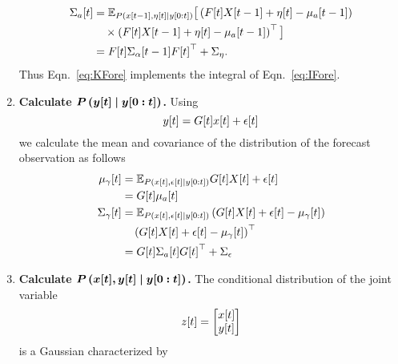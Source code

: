 \begin{enumerate}
\begin{align}
     {\Sigma_a}{[t]} &= \mathbb{E}_{P
       \left({x}{[t-1]},{\eta}{[t]}\mid y[0:t] \right)} \big[
     \left( {F}{[t]}{X}{[t-1]} + {\eta}{[t]} - {\mu_a}{[t-1]}
     \right) \nonumber\\
     & \quad \times \left( {F}{[t]}{X}{[t-1]} + {\eta}{[t]} -
       {\mu_a}{[t-1]} \right)^\top \big] \\
    &= {F}{[t]}{\Sigma_\alpha}{[t-1]}{F}{[t]}^\top +
    \Sigma_\eta .
  \end{align}
  Thus Eqn.~\eqref{eq:KFore} implements the integral of
  Eqn.~\eqref{eq:IFore}.
\item \label{PYforecast} \textbf{Calculate
    $\bm{P\left({y}{[t]}\mid y[0:t] \right)}$.}  Using
  \begin{equation*}
    {y}{[t]} = {G}{[t]}{x}{[t]} + {\epsilon}{[t]}
  \end{equation*}
  we calculate the mean and covariance of the distribution of the
  forecast observation as follows
  \begin{align}
    {\mu_\gamma}{[t]} &= \mathbb{E}_{P
      \left({x}{[t]},{\epsilon}{[t]}\mid y[0:t] \right)}
    {G}{[t]}{X}{[t]} + {\epsilon}{[t]} \nonumber \\
    \label{eq:mugamma}
    &= {G}{[t]}{\mu_a}{[t]}\\
    {\Sigma_\gamma}{[t]} &= \mathbb{E}_{P
      \left({x}{[t]},{\epsilon}{[t]}\mid y[0:t] \right)}
    \left( {G}{[t]}{X}{[t]} + {\epsilon}{[t]} -
      {\mu_\gamma}{[t]} \right) \nonumber \\
    &\quad\left( {G}{[t]}{X}{[t]} +
      {\epsilon}{[t]} - {\mu_\gamma}{[t]}
    \right)^\top \nonumber \\
    \label{eq:Sigmagamma}
    &= {G}{[t]}{\Sigma_a}{[t]}{G}{[t]}^\top +
    \Sigma_\epsilon
  \end{align}
\item \label{PZforecast} \textbf{Calculate $\bm{P\left({x}{[t]},
        {y}{[t]}\mid y[0:t] \right)}$.}  The conditional
  distribution of the joint variable
  \begin{equation*}
    {z}{[t]} =
    \begin{bmatrix}
      {x}{[t]}\\
      {y}{[t]}
    \end{bmatrix}
  \end{equation*}
  is a Gaussian characterized by

\end{enumerate}
